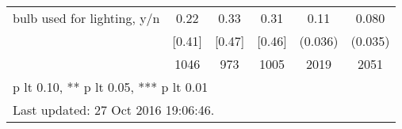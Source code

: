\begin{table}[htbp]
\begin{tabular*}{0.9\hsize}{@{\hskip\tabcolsep\extracolsep\fill}l*{1}{ccccc}}
bulb used for lighting, y/n     &     0.22&     0.33&     0.31&     0.11\sym{***}&    0.080\sym{**} \\
                                &   [0.41]&   [0.47]&   [0.46]&  (0.036)         &  (0.035)         \\
                                &     1046&      973&     1005&     2019         &     2051         \\
\bottomrule
\multicolumn{6}{l}{\footnotesize * p lt 0.10, ** p lt 0.05, *** p lt 0.01}\\
\multicolumn{6}{l}{\footnotesize Last updated: 27 Oct 2016 19:06:46.}\\
\end{tabular*}
\end{table}
